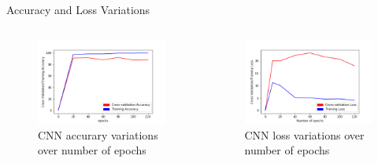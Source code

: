 \documentclass[10pt, a4paper]{beamer}
\begin{document}
\begin{frame}{Accuracy and Loss Variations}
\begin{columns}

\begin{figure}
 \includegraphics[height=0.48 \textheight]{epoch_vs_accuracy.png}
 \caption{\scriptsize CNN accurary variations over number of epochs }
\end{figure}

\begin{figure}
 \includegraphics[height=0.48 \textheight]{epoch_vs_loss.png}
 \caption{\scriptsize CNN loss variations over number of epochs}
\end{figure}

\end{columns}
\end{frame}
\end{document}
